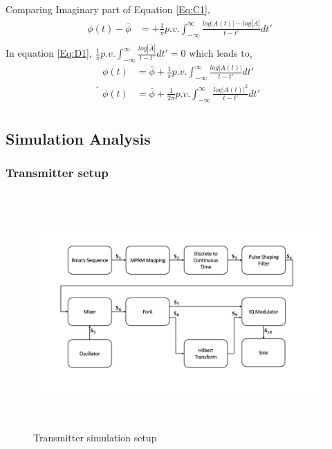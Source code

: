 Comparing Imaginary part of Equation \ref{Eq:C1},
\begin{equation}
\begin{split}
\phi(t)-\bar{\phi} &= + \frac{1}{\pi} p.v. \int_{-\infty}^{\infty} \frac{log|A(t)|-log|\bar{A}|}{t-t'} dt'\\
\end{split}
\label{Eq:D1}
\end{equation}
In equation \ref{Eq:D1}, $\frac{1}{\pi} p.v. \int_{-\infty}^{\infty} \frac{log|\bar{A}|}{t-t'} dt'=0$ which leads to,
\begin{equation}.
\begin{split}
\phi(t) &= \bar{\phi} + \frac{1}{\pi} p.v. \int_{-\infty}^{\infty} \frac{log|A(t)|}{t-t'} dt'\\
\phi(t) &= \bar{\phi} + \frac{1}{2\pi} p.v. \int_{-\infty}^{\infty} \frac{log|A(t)|^2}{t-t'} dt'\\
\end{split}
\label{Eq:E1}
\end{equation}
\newpage
\subsection{Simulation Analysis}
\subsubsection{Transmitter setup}
\begin{center}
\begin{figure}[h]
	\centering
	\includegraphics[width=1\textwidth, height=9cm]{./sdf/simplified_coherent_receiver/figures/Simulation_setup_Tx.pdf}
	\caption{Transmitter simulation setup}\label{Simulation_setup_Tx}
\end{figure}
\end{center}
